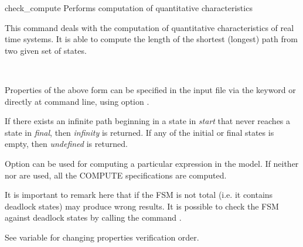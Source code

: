\begin{nusmvCommand}{check\_compute} {Performs computation of quantitative characteristics}


This command deals with the computation of quantitative
characteristics of real time systems. It is able to compute the length
of the shortest (longest) path from two given set of states.
\begin{center}
 \\
\end{center}
Properties of the above form can be specified in the input file via
the keyword  or directly at command line, using option
.

If there exists an infinite path beginning in a state in
\textit{start} that never reaches a state in \textit{final}, then
\textit{infinity} is returned. If any of the initial or final states 
is empty, then \textit{undefined} is returned.

Option  can be used for computing a particular
expression in the model. If neither  nor 
are used, all the COMPUTE specifications are computed.

It is important to remark here that if the FSM is not total (i.e. it
contains deadlock states)  may produce wrong
results. It is possible to check the FSM against deadlock states by
calling the command .

See variable  for changing properties
verification order.

\begin{cmdOpt}







\end{cmdOpt}
\end{nusmvCommand}
